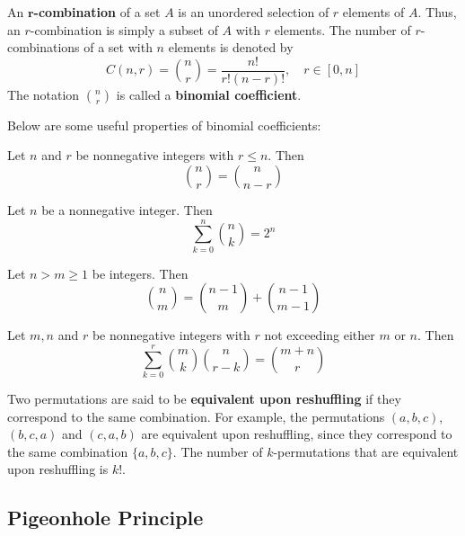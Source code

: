 \begin{definition}[$r$-Combination]
    An \textbf{$\bm{r}$-combination} of a set $A$ is an unordered selection of $r$ elements of $A$.
    Thus, an $r$-combination is simply a subset of $A$ with $r$ elements. The number of
    $r$-combinations of a set with $n$ elements is denoted by
    \[
        C(n,r) = \binom{n}{r} = \frac{n!}{r!(n-r)!},\quad r\in[0,n]
    \]
    The notation $\binom{n}{r}$ is called a \textbf{binomial coefficient}.
\end{definition}

Below are some useful properties of binomial coefficients:

\begin{corollary}
    Let $n$ and $r$ be nonnegative integers with $r \leq n$. Then
    \[
        \binom{n}{r} = \binom{n}{n-r}
    \]
\end{corollary}

\begin{corollary}
    Let $n$ be a nonnegative integer. Then
    \[
        \sum_{k=0}^n \binom{n}{k} = 2^n
    \]
\end{corollary}

\begin{corollary}
    Let $n>m\geq 1$ be integers. Then
    \[
        \binom{n}{m} = \binom{n-1}{m} + \binom{n-1}{m-1}
    \]
\end{corollary}

\begin{theorem}
    Let $m,n$ and $r$ be nonnegative integers with $r$ not exceeding either $m$ or $n$. Then
    \[
        \sum_{k=0}^r \binom{m}{k} \binom{n}{r-k} = \binom{m+n}{r}
    \]
\end{theorem}

\begin{definition}
    Two permutations are said to be \textbf{equivalent upon reshuffling} if they correspond
    to the same combination. For example, the permutations $(a,b,c)$, $(b,c,a)$ and $(c,a,b)$
    are equivalent upon reshuffling, since they correspond to the same combination $\{a,b,c\}$.
    The number of $k$-permutations that are equivalent upon reshuffling is $k!$.
\end{definition}

\subsection{Pigeonhole Principle}

